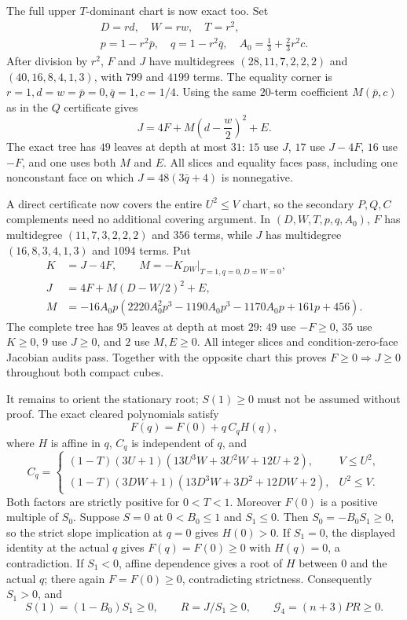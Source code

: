 \documentclass[11pt]{article}
\theoremstyle{remark}
\begin{document}
The full upper $T$-dominant chart is now exact too.  Set
\begin{gather*}
D=rd,\quad W=rw,\quad T=r^2,\\
p=1-r^2\bar p,\quad q=1-r^2\bar q,\quad
A_0=\frac13+\frac23r^2c.
\end{gather*}
After division by $r^2$, $F$ and $J$ have multidegrees
$(28,11,7,2,2,2)$ and $(40,16,8,4,1,3)$, with $799$ and $4199$ terms.
The equality corner is
$r=1,d=w=\bar p=0,\bar q=1,c=1/4$.  Using the same $20$-term
coefficient $M(\bar p,c)$ as in the $Q$ certificate gives
\[
J=4F+M\left(d-\frac w2\right)^2+E.
\]
The exact tree has $49$ leaves at depth at most $31$: $15$ use $J$,
$17$ use $J-4F$, $16$ use $-F$, and one uses both $M$ and $E$.
All slices and equality faces pass, including one nonconstant face on
which $J=48(3\bar q+4)$ is nonnegative.

A direct certificate now covers the entire $U^2\leq V$ chart, so the
secondary $P,Q,C$ complements need no additional covering argument.
In $(D,W,T,p,q,A_0)$, $F$ has multidegree $(11,7,3,2,2,2)$ and $356$
terms, while $J$ has multidegree $(16,8,3,4,1,3)$ and $1094$ terms.
Put
\[
\begin{split}
K&=J-4F,\qquad
M=-K_{DW}\big|_{T=1,q=0,D=W=0},\\
J&=4F+M(D-W/2)^2+E,\\
M&=-16A_0p(2220A_0^2p^3-1190A_0p^3-1170A_0p+161p+456).
\end{split}
\]
The complete tree has $95$ leaves at depth at most $29$: $49$ use
$-F\geq0$, $35$ use $K\geq0$, $9$ use $J\geq0$, and $2$ use
$M,E\geq0$. All integer slices and condition-zero-face Jacobian audits
pass. Together with the opposite chart this proves $F\geq0\Rightarrow
J\geq0$ throughout both compact cubes.

It remains to orient the stationary root; $S(1)\geq0$ must not be
assumed without proof. The exact cleared polynomials satisfy
\[
                     F(q)=F(0)+q\,C_qH(q),
\]
where $H$ is affine in $q$, $C_q$ is independent of $q$, and
\[
C_q=\begin{cases}
(1-T)(3U+1)(13U^3W+3U^2W+12U+2),&V\leq U^2,\\
(1-T)(3DW+1)(13D^3W+3D^2+12DW+2),&U^2\leq V.
\end{cases}
\]
Both factors are strictly positive for $0<T<1$. Moreover $F(0)$ is a
positive multiple of $S_0$. Suppose $S=0$ at $0<B_0\leq1$ and
$S_1\leq0$. Then $S_0=-B_0S_1\geq0$, so the strict slope implication
at $q=0$ gives $H(0)>0$. If $S_1=0$, the displayed identity at the
actual $q$ gives $F(q)=F(0)\geq0$ with $H(q)=0$, a contradiction.
If $S_1<0$, affine dependence gives a root of $H$ between $0$ and the
actual $q$; there again $F=F(0)\geq0$, contradicting strictness.
Consequently $S_1>0$, and
\[
 S(1)=(1-B_0)S_1\geq0,\qquad
 R=J/S_1\geq0,\qquad \mathcal G_4=(n+3)PR\geq0.
\]
\end{document}
